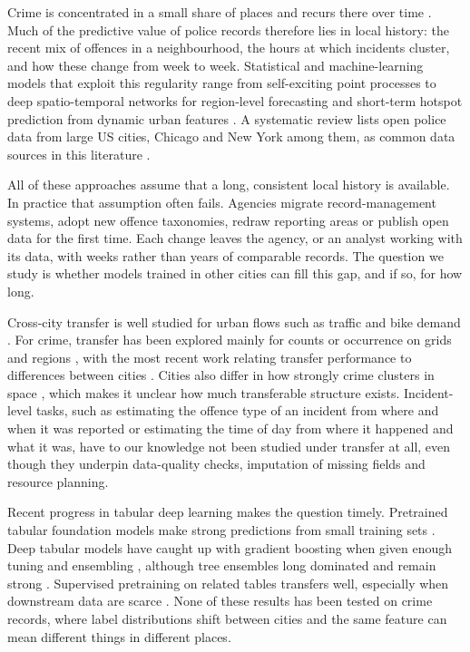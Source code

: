 \documentclass[11pt]{article}
\begin{document}
Crime is concentrated in a small share of places and recurs there over time \citep{weisburd2015}. Much of the predictive value of police records therefore lies in local history: the recent mix of offences in a neighbourhood, the hours at which incidents cluster, and how these change from week to week. Statistical and machine-learning models that exploit this regularity range from self-exciting point processes \citep{mohler2011} to deep spatio-temporal networks for region-level forecasting \citep{huang2018deepcrime,xia2021stshn,li2022sthsl} and short-term hotspot prediction from dynamic urban features \citep{rumi2018}. A systematic review lists open police data from large US cities, Chicago and New York among them, as common data sources in this literature \citep{mandalapu2023}.

All of these approaches assume that a long, consistent local history is available. In practice that assumption often fails. Agencies migrate record-management systems, adopt new offence taxonomies, redraw reporting areas or publish open data for the first time. Each change leaves the agency, or an analyst working with its data, with weeks rather than years of comparable records. The question we study is whether models trained in other cities can fill this gap, and if so, for how long.

Cross-city transfer is well studied for urban flows such as traffic and bike demand \citep{wang2019regiontrans,yao2019metast,jin2022crosstres}. For crime, transfer has been explored mainly for counts or occurrence on grids and regions \citep{zhao2017transfer,bappee2021,wu2024transfer,karimova2025,shan2026}, with the most recent work relating transfer performance to differences between cities \citep{shan2026}. Cities also differ in how strongly crime clusters in space \citep{walter2023}, which makes it unclear how much transferable structure exists. Incident-level tasks, such as estimating the offence type of an incident from where and when it was reported or estimating the time of day from where it happened and what it was, have to our knowledge not been studied under transfer at all, even though they underpin data-quality checks, imputation of missing fields and resource planning.

Recent progress in tabular deep learning makes the question timely. Pretrained tabular foundation models make strong predictions from small training sets \citep{hollmann2025,qu2025tabicl}. Deep tabular models have caught up with gradient boosting when given enough tuning and ensembling \citep{gorishniy2025,erickson2025}, although tree ensembles long dominated and remain strong \citep{grinsztajn2022,erickson2025}. Supervised pretraining on related tables transfers well, especially when downstream data are scarce \citep{levin2023}. None of these results has been tested on crime records, where label distributions shift between cities and the same feature can mean different things in different places.
\end{document}
